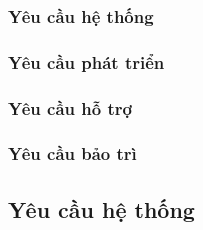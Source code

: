 \documentclass[../Thesis.tex]{subfiles}
\begin{document}
        \subsubsection{Yêu cầu hệ thống}

        \subsubsection{Yêu cầu phát triển}

        \subsubsection{Yêu cầu hỗ trợ}

        \subsubsection{Yêu cầu bảo trì}

    \subsection{Yêu cầu hệ thống}


  
  
  
  


    
\end{document}
